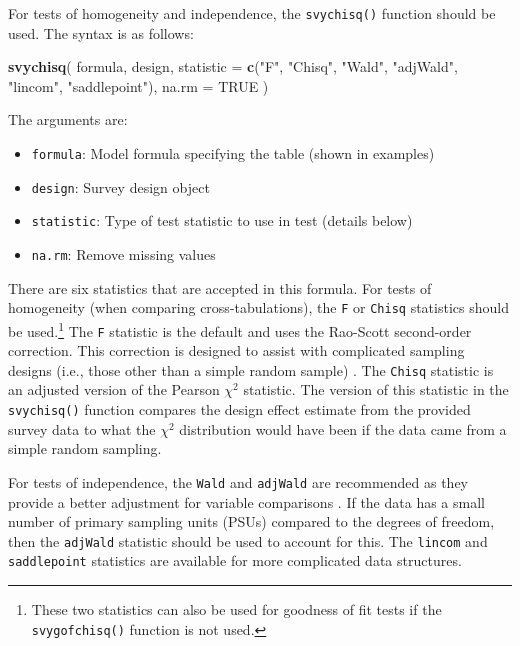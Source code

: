 \documentclass[
]{krantz}
\makeatletter
\newenvironment{Shaded}{\begin{snugshade}}{\end{snugshade}}
\newcommand{\AttributeTok}[1]{\textcolor[rgb]{0.27,0.27,0.27}{#1}}
\newcommand{\ConstantTok}[1]{\textcolor[rgb]{0.37,0.37,0.37}{#1}}
\newcommand{\FunctionTok}[1]{\textcolor[rgb]{0.27,0.27,0.27}{\textbf{#1}}}
\newcommand{\NormalTok}[1]{#1}
\newcommand{\StringTok}[1]{\textcolor[rgb]{0.5,0.5,0.5}{#1}}
\providecommand{\tightlist}{%
  \setlength{\itemsep}{0pt}\setlength{\parskip}{0pt}}
\newenvironment{kframe}{%
\medskip{}
\setlength{\fboxsep}{.8em}
 \def\at@end@of@kframe{}%
 \ifinner\ifhmode%
  \def\at@end@of@kframe{\end{minipage}}%
  \begin{minipage}{\columnwidth}%
 \fi\fi%
 \def\FrameCommand##1{\hskip\@totalleftmargin \hskip-\fboxsep
 \colorbox{shadecolor}{##1}\hskip-\fboxsep
     \hskip-\linewidth \hskip-\@totalleftmargin \hskip\columnwidth}%
 \MakeFramed {\advance\hsize-\width
   \@totalleftmargin\z@ \linewidth\hsize
   \@setminipage}}%
 {\par\unskip\endMakeFramed%
 \at@end@of@kframe}
\renewenvironment{Shaded}{\begin{kframe}}{\end{kframe}}
\makeatother
\begin{document}
For tests of homogeneity and independence, the \texttt{svychisq()} function should be used. The syntax is as follows:

\begin{Shaded}
\begin{Highlighting}[]
\FunctionTok{svychisq}\NormalTok{(}
\NormalTok{  formula,}
\NormalTok{  design,}
  \AttributeTok{statistic =} \FunctionTok{c}\NormalTok{(}\StringTok{"F"}\NormalTok{, }\StringTok{"Chisq"}\NormalTok{, }\StringTok{"Wald"}\NormalTok{, }\StringTok{"adjWald"}\NormalTok{,}
                \StringTok{"lincom"}\NormalTok{, }\StringTok{"saddlepoint"}\NormalTok{),}
  \AttributeTok{na.rm =} \ConstantTok{TRUE}
\NormalTok{)}
\end{Highlighting}
\end{Shaded}

The arguments are:

\begin{itemize}
\tightlist
\item
  \texttt{formula}: Model formula specifying the table (shown in examples)
\item
  \texttt{design}: Survey design object
\item
  \texttt{statistic}: Type of test statistic to use in test (details below)
\item
  \texttt{na.rm}: Remove missing values
\end{itemize}

There are six statistics that are accepted in this formula. For tests of homogeneity (when comparing cross-tabulations), the \texttt{F} or \texttt{Chisq} statistics should be used.\footnote{These two statistics can also be used for goodness of fit tests if the \texttt{svygofchisq()} function is not used.} The \texttt{F} statistic is the default and uses the Rao-Scott second-order correction. This correction is designed to assist with complicated sampling designs (i.e., those other than a simple random sample) \citep{Scott2007}. The \texttt{Chisq} statistic is an adjusted version of the Pearson \(\chi^2\) statistic. The version of this statistic in the \texttt{svychisq()} function compares the design effect estimate from the provided survey data to what the \(\chi^2\) distribution would have been if the data came from a simple random sampling.

For tests of independence, the \texttt{Wald} and \texttt{adjWald} are recommended as they provide a better adjustment for variable comparisons \citep{lumley2010complex}. If the data has a small number of primary sampling units (PSUs) compared to the degrees of freedom, then the \texttt{adjWald} statistic should be used to account for this. The \texttt{lincom} and \texttt{saddlepoint} statistics are available for more complicated data structures.
\end{document}

